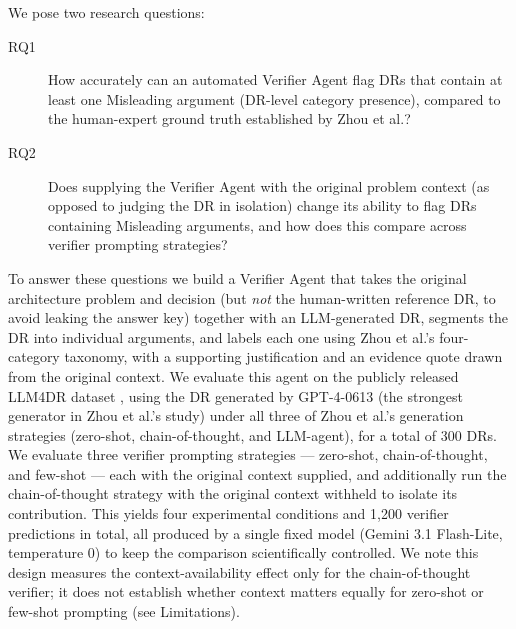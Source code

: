 \documentclass[runningheads]{llncs}
\begin{document}
We pose two research questions:

\begin{description}
\item[RQ1] How accurately can an automated Verifier Agent flag DRs that contain at least one Misleading argument (DR-level category presence), compared to the human-expert ground truth established by Zhou et al.?
\item[RQ2] Does supplying the Verifier Agent with the original problem context (as opposed to judging the DR in isolation) change its ability to flag DRs containing Misleading arguments, and how does this compare across verifier prompting strategies?
\end{description}

To answer these questions we build a Verifier Agent that takes the original architecture problem and decision (but \emph{not} the human-written reference DR, to avoid leaking the answer key) together with an LLM-generated DR, segments the DR into individual arguments, and labels each one using Zhou et al.'s four-category taxonomy, with a supporting justification and an evidence quote drawn from the original context. We evaluate this agent on the publicly released LLM4DR dataset \cite{zhou2025llm}, using the DR generated by GPT-4-0613 (the strongest generator in Zhou et al.'s study) under all three of Zhou et al.'s generation strategies (zero-shot, chain-of-thought, and LLM-agent), for a total of 300 DRs. We evaluate three verifier prompting strategies --- zero-shot, chain-of-thought, and few-shot --- each with the original context supplied, and additionally run the chain-of-thought strategy with the original context withheld to isolate its contribution. This yields four experimental conditions and 1{,}200 verifier predictions in total, all produced by a single fixed model (Gemini 3.1 Flash-Lite, temperature 0) to keep the comparison scientifically controlled. We note this design measures the context-availability effect only for the chain-of-thought verifier; it does not establish whether context matters equally for zero-shot or few-shot prompting (see Limitations).
\end{document}
